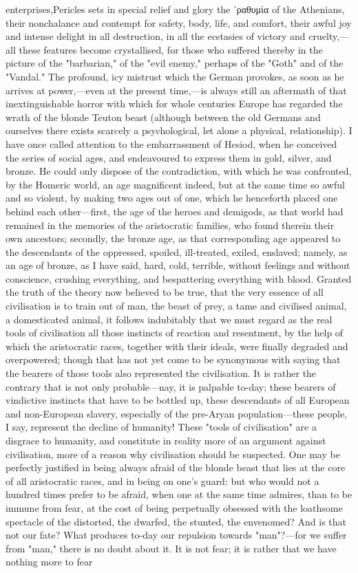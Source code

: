 \documentclass[12pt]{article}
\begin{document}
enterprises,Pericles sets in special relief and glory the ᾽ραθυμία of the Athenians, their nonchalance and contempt for safety, body, life, and comfort, their awful joy and intense delight in all destruction, in all the ecstasies of victory and cruelty,---all these features become crystallised, for those who suffered thereby in the picture of the "barbarian," of the "evil enemy," perhaps of the "Goth" and of the "Vandal." The profound, icy mistrust which the German provokes, as soon as he arrives at power,---even at the present time,---is always still an aftermath of that inextinguishable horror with which for whole centuries Europe has regarded the wrath of the blonde Teuton beast (although between the old Germans and ourselves there exists scarcely a psychological, let alone a physical, relationship). I have once called attention to the embarrassment of Hesiod, when he conceived the series of social ages, and endeavoured to express them in gold, silver, and bronze. He could only dispose of the contradiction, with which he was confronted, by the Homeric world, an age magnificent indeed, but at the same time so awful and so violent, by making two ages out of one, which he henceforth placed one behind each other---first, the age of the heroes and demigods, as that world had remained in the memories of the aristocratic families, who found therein their own ancestors; secondly, the bronze age, as that corresponding age appeared to the descendants of the oppressed, spoiled, ill-treated, exiled, enslaved; namely, as an age of bronze, as I have said, hard, cold, terrible, without feelings and without conscience, crushing everything, and bespattering everything with blood. Granted the truth of the theory now believed to be true, that the very essence of all civilisation is to train out of man, the beast of prey, a tame and civilised animal, a domesticated animal, it follows indubitably that we must regard as the real tools of civilisation all those instincts of reaction and resentment, by the help of which the aristocratic races, together with their ideals, were finally degraded and overpowered; though that has not yet come to be synonymous with saying that the bearers of those tools also represented the civilisation. It is rather the contrary that is not only probable---nay, it is palpable to-day; these bearers of vindictive instincts that have to be bottled up, these descendants of all European and non-European slavery, especially of the pre-Aryan population---these people, I say, represent the decline of humanity! These "tools of civilisation" are a disgrace to humanity, and constitute in reality more of an argument against civilisation, more of a reason why civilisation should be suspected. One may be perfectly justified in being always afraid of the blonde beast that lies at the core of all aristocratic races, and in being on one's guard: but who would not a hundred times prefer to be afraid, when one at the same time admires, than to be immune from fear, at the cost of being perpetually obsessed with the loathsome spectacle of the distorted, the dwarfed, the stunted, the envenomed? And is that not our fate? What produces to-day our repulsion towards "man"?---for we suffer from "man," there is no doubt about it. It is not fear; it is rather that we have nothing more to fear 
\end{document}
